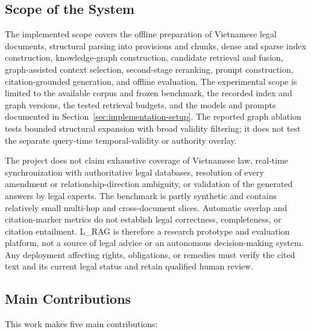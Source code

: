 \subsection{Scope of the System}
\label{sec:scope}

The implemented scope covers the offline preparation of Vietnamese legal
documents, structural parsing into provisions and chunks, dense and sparse
index construction, knowledge-graph construction, candidate retrieval and
fusion, graph-assisted context selection, second-stage reranking, prompt
construction, citation-grounded generation, and offline evaluation. The
experimental scope is limited to the available corpus and frozen benchmark,
the recorded index and graph versions, the tested retrieval budgets, and the
models and prompts documented in Section~\ref{sec:implementation-setup}. The
reported graph ablation tests bounded structural expansion with broad validity
filtering; it does not test the separate query-time temporal-validity or
authority overlay.

The project does not claim exhaustive coverage of Vietnamese law, real-time
synchronization with authoritative legal databases, resolution of every
amendment or relationship-direction ambiguity, or validation of the generated
answers by legal experts. The benchmark is partly synthetic and contains
relatively small multi-hop and cross-document slices. Automatic overlap and
citation-marker metrics do not establish legal correctness, completeness, or
citation entailment. L\_RAG is therefore a research prototype and evaluation
platform, not a source of legal advice or an autonomous decision-making
system. Any deployment affecting rights, obligations, or remedies must verify
the cited text and its current legal status and retain qualified human review.

\subsection{Main Contributions}
\label{sec:contributions}

This work makes five main contributions:


